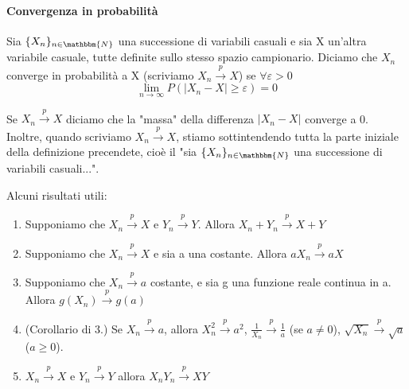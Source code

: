 \paragraph{Convergenza in probabilità}
\begin{definizione}

Sia $\{X_n\}_{n\in\mathbbm{N}}$ una successione di variabili casuali e 
sia X un'altra variabile casuale, tutte definite sullo stesso spazio campionario.
Diciamo che $X_n$ converge in probabilità a X (scriviamo $X_n\stackrel{p}{\rightarrow}X$) se $\forall\varepsilon>0$ $$\lim_{n \rightarrow\infty} P(|X_n-X|\geq\varepsilon)=0$$
\end{definizione}
\begin{oss}
Se $X_n\stackrel{p}{\rightarrow}X$ diciamo che la "massa" della differenza $|X_n-X|$ converge a 0.
Inoltre, quando scriviamo $X_n\stackrel{p}{\rightarrow}X$, stiamo sottintendendo tutta la parte iniziale della definizione precendete, cioè il "sia $\{X_n\}_{n\in\mathbbm{N}}$ una successione di variabili casuali...".
\end{oss}
\begin{teo} Alcuni risultati utili: 

\begin{enumerate}
\item Supponiamo che  $X_n\stackrel{p}{\rightarrow}X$ e  $Y_n\stackrel{p}{\rightarrow}Y$. Allora  $X_n+Y_n\stackrel{p}{\rightarrow}X+Y$
\item Supponiamo che $X_n\stackrel{p}{\rightarrow}X$ e sia a una costante. Allora $aX_n\stackrel{p}{\rightarrow}aX$ 
\item Supponiamo che  $X_n\stackrel{p}{\rightarrow}a$ costante, e sia g una funzione reale continua in a. Allora  $g(X_n)\stackrel{p}{\rightarrow}g(a)$
\item (Corollario di 3.) Se $X_n\stackrel{p}{\rightarrow}a$, allora $X_n^2\stackrel{p}{\rightarrow}a^2$, $\frac{1}{X_n}\stackrel{p}{\rightarrow}\frac{1}{a}$ (se $a\neq0$), $\sqrt{X_n}\stackrel{p}{\rightarrow}\sqrt{a}$ ($a\geq0$).
\item $X_n\stackrel{p}{\rightarrow}X$ e $Y_n\stackrel{p}{\rightarrow}Y$ allora $X_nY_n\stackrel{p}{\rightarrow}XY$
\end{enumerate}
\end{teo}
